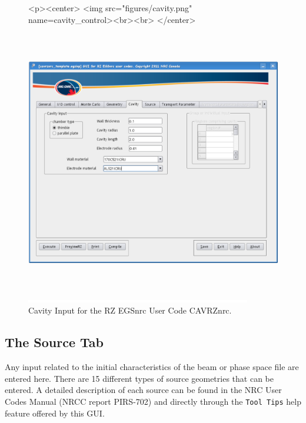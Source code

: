 \documentclass[12pt,twoside]{article}   %
\begin{document}
\begin{figure}[htb]
\begin{htmlonly}
\begin{rawhtml}
<p><center>
<img src="figures/cavity.png" name=cavity_control><br><br>
</center>
\end{rawhtml}
\end{htmlonly}
\begin{latexonly}
\begin{center}
\includegraphics[height=11.56cm]{figures/cavity}
\end{center}
\end{latexonly}
\begin{center}
\includegraphics[height=1mm]{figures/fake2}
\end{center}
\caption{Cavity Input for the RZ EGSnrc User Code CAVRZnrc.}
\label{cavity_control}
\end{figure}

\clearpage
\newpage
\subsection{The Source Tab}
Any input related to the initial characteristics of the beam or phase space file are entered
here. There are 15 different types of source geometries that can be entered. A detailed description
of each source can be found in the NRC User Codes Manual (NRCC report PIRS-702\cite{Ro10})
and directly through the {\tt Tool Tips} help feature offered by this GUI. \\ \\
\end{document}
